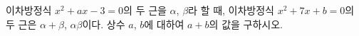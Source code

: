 이차방정식 $x^2+ax-3=0$의 두 근을 $\alpha$, $\beta$라 할 때, 이차방정식 $x^2+7x+b=0$의 두 근은 $\alpha+\beta$, $\alpha\beta$이다. 상수 $a$, $b$에 대하여 $a+b$의 값을 구하시오.

